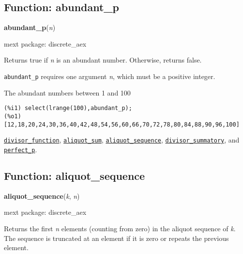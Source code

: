 \documentclass[]{article}
\begin{document}
\subsection{Function: abundant\_p\label{sec:abundant_p}}
\hypertarget{abundant_p}{}
{\bf abundant\_p}({\it n})


\noindent mext package: discrete\_aex



\vspace{5 pt}
Returns true if {\it n} is an abundant number. Otherwise, returns false. 

\vspace{5 pt}

   {\tt abundant\_p} requires one argument {\it n}, which must be a positive integer.


\vspace{5 pt}


   The abundant numbers between 1 and 100 

\begin{Verbatim}[frame=single]
(%i1) select(lrange(100),abundant_p);
(%o1) [12,18,20,24,30,36,40,42,48,54,56,60,66,70,72,78,80,84,88,90,96,100]
\end{Verbatim}


  \hyperlink{divisor_function}{{\tt divisor\_function}}, \hyperlink{aliquot_sum}{{\tt aliquot\_sum}}, \hyperlink{aliquot_sequence}{{\tt aliquot\_sequence}}, \hyperlink{divisor_summatory}{{\tt divisor\_summatory}}, and \hyperlink{perfect_p}{{\tt perfect\_p}}.

\vspace{5 pt}


\subsection{Function: aliquot\_sequence\label{sec:aliquot_sequence}}
\hypertarget{aliquot_sequence}{}
{\bf aliquot\_sequence}({\it k}, {\it n})


\noindent mext package: discrete\_aex



\vspace{5 pt}
Returns the first {\it n} elements (counting from zero) in the aliquot sequence of {\it k}. The sequence is truncated at an element if it is zero or repeats the previous element. 

\vspace{5 pt}
\end{document}
